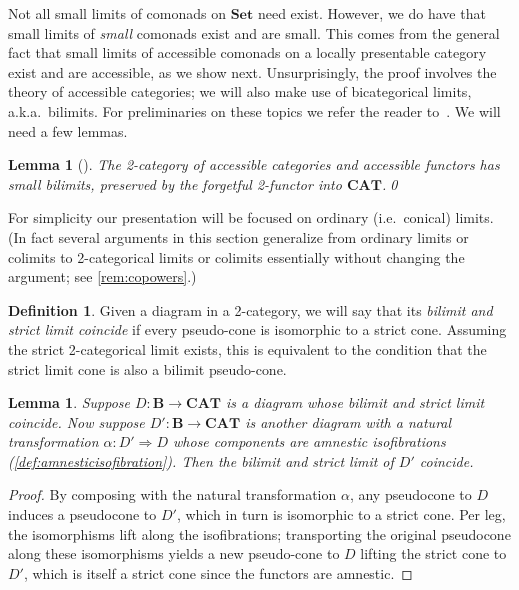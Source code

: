 \documentclass[11pt, oneside, article]{memoir}
\theoremstyle{plain}
\newtheorem{lemma}[theorem]{Lemma}
\theoremstyle{definition}
\newtheorem{definition}[def]{Definition}
\theoremstyle{remark}
\newcommand{\namedcat}[1]{\mathbf{#1}}
\newcommand{\cat}[1]{\mathbf{#1}}
\newcommand{\Set}{\namedcat{Set}}
\newcommand{\CAT}{\namedcat{CAT}}
\newcommand{\bB}{\cat{B}}
\newcommand{\bS}{\cat{S}}
\begin{document}

Not all small limits of comonads on $\Set$ need exist. However, we do
have that small limits of \emph{small} comonads exist and are
small. This comes from the general fact that small limits of
accessible comonads on a locally presentable category exist and are
accessible, as we show next. Unsurprisingly, the proof involves the
theory of accessible categories; we will also make use of
bicategorical limits, a.k.a.\ bilimits. For preliminaries on these
topics we refer the reader to~\cite{makkai-pare}. We will need a few
lemmas.

\begin{lemma}[{\cite[Theorem 5.1.6]{makkai-pare}}]\label{lem:accessiblebilimits}
  The 2-category of accessible categories and accessible functors has
  small bilimits, preserved by the forgetful 2-functor into
  $\CAT$.\qed
\end{lemma}

For simplicity our presentation will be focused on ordinary (i.e.\
conical) limits. (In fact several arguments in this section generalize
from ordinary limits or colimits to 2-categorical limits or colimits
essentially without changing the argument; see \cref{rem:copowers}.)

\begin{definition}\label{def:limbilim}
  Given a diagram in a 2-category, we will say that its \emph{bilimit
    and strict limit coincide} if every pseudo-cone is isomorphic to a
  strict cone. Assuming the strict 2-categorical limit exists, this is
  equivalent to the condition that the strict limit cone is also a
  bilimit pseudo-cone.
\end{definition}

\begin{lemma}\label{lem:limbilim}
  Suppose $D \colon \bB \to \CAT$ is a diagram whose bilimit and
  strict limit coincide. Now suppose $D' \colon \bB \to \CAT$ is
  another diagram with a natural transformation
  $\alpha \colon D' \Rightarrow D$ whose components are amnestic
  isofibrations (\cref{def:amnesticisofibration}). Then the bilimit
  and strict limit of $D'$ coincide.
\end{lemma}
\begin{proof}
  By composing with the natural transformation $\alpha$, any
  pseudocone to $D$ induces a pseudocone to $D'$, which in turn is
  isomorphic to a strict cone. Per leg, the isomorphisms lift along
  the isofibrations; transporting the original pseudocone along these
  isomorphisms yields a new pseudo-cone to $D$ lifting the strict cone
  to $D'$, which is itself a strict cone since the functors are
  amnestic.
\end{proof}
\end{document}
